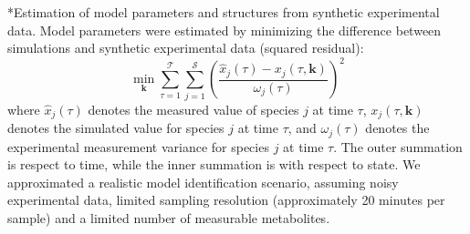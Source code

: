 \documentclass[12pt]{article}
\makeatletter
\renewcommand\subsection{\@startsection
	{subsection}{2}{0mm}
	{-0.05in}
	{-0.5\baselineskip}
	{\normalfont\normalsize\bfseries}}
\makeatother
\begin{document}
\subsection*{Estimation of model parameters and structures from synthetic experimental data.}
Model parameters were estimated by minimizing the difference between simulations and synthetic experimental data (squared residual):
\begin{equation}\label{eqn:objective-function}
	\min_{\mathbf{k}} \sum_{\tau=1}^{\mathcal{T}}\sum_{j=1}^{\mathcal{S}}\left(\frac{\hat{x}_{j}\left(\tau\right) - x_{j}\left(\tau,\mathbf{k}\right)}{\omega_{j}\left(\tau\right)}\right)^{2}
\end{equation}where $\hat{x}_{j}\left(\tau\right)$ denotes the measured value of species $j$ at time $\tau$, $x_{j}\left(\tau,\mathbf{k}\right)$ denotes the simulated 
value for species $j$ at time $\tau$, and $\omega_{j}\left(\tau\right)$ denotes the experimental measurement variance for species $j$ at time $\tau$. The outer summation is respect to
time, while the inner summation is with respect to state. We approximated a realistic model identification scenario, assuming noisy experimental data, 
limited sampling resolution (approximately 20 minutes per sample) and a limited number of measurable metabolites. 
\end{document}
